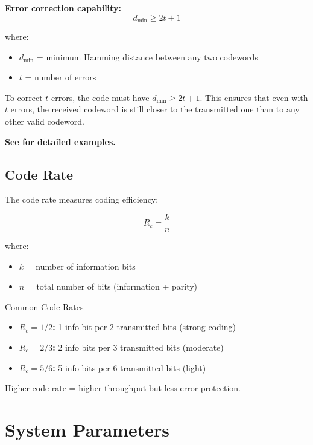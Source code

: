 \textbf{Error correction capability:}
\begin{equation}
\label{eq:hamming-correction}
d_{\min} \geq 2t + 1
\end{equation}

where:
\begin{itemize}
\item $d_{\min}$ = minimum Hamming distance between any two codewords
\item $t$ = number of errors
\end{itemize}

\begin{keyconcept}
To correct $t$ errors, the code must have $d_{\min} \geq 2t + 1$. This ensures that even with $t$ errors, the received codeword is still closer to the transmitted one than to any other valid codeword.
\end{keyconcept}

\textbf{See  for detailed examples.}

\subsection{Code Rate}
\label{subsec:code-rate}

The code rate measures coding efficiency:

\begin{equation}
\label{eq:code-rate}
R_c = \frac{k}{n}
\end{equation}

where:
\begin{itemize}
\item $k$ = number of information bits
\item $n$ = total number of bits (information + parity)
\end{itemize}

\begin{calloutbox}{Common Code Rates}
\begin{itemize}
\item \textbf{$R_c = 1/2$:} 1 info bit per 2 transmitted bits (strong coding)
\item \textbf{$R_c = 2/3$:} 2 info bits per 3 transmitted bits (moderate)
\item \textbf{$R_c = 5/6$:} 5 info bits per 6 transmitted bits (light)
\end{itemize}
Higher code rate = higher throughput but less error protection.
\end{calloutbox}

\section{System Parameters}
\label{sec:system-parameters}

